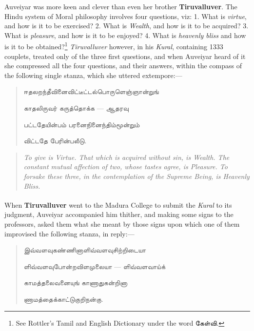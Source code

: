 \documentclass{article}
\newcommand{\TamilText}[1]{\texttamil{#1}}
\newcommand{\tam}[1]{\TamilText{#1}}
\begin{document}
Auveiyar was more keen and clever than even her brother \textbf{Tiruvalluver}. The Hindu system of Moral philosophy involves four questions, viz: 1. What is \emph{virtue}, and how is it to be exercised? 2. What is \emph{Wealth}, and how is it to be acquired? 3. What is \emph{pleasure}, and how is it to be enjoyed? 4. What is \emph{heavenly bliss} and how is it to be obtained?\footnote{See Rottler's Tamil and English Dictionary under the word \tam{கேள்வி}.} \emph{Tiruvalluver} however, in his \emph{Kural}, containing 1333 couplets, treated only of the three first questions, and when Auveiyar heard of it she compressed all the four questions, and their answers, within the compass of the following single stanza, which she uttered extempore:---
\begin{quotation}\small
\tam{ஈதலறந்தீவினைவிட்டீட்டல்பொருளெஞ்ஞான்றுங்‌}

\tam{காதலிருவர்‌ கருத்தொக்க} --- \tam{ஆதரவு}

\tam{பட்டதேயின்பம்‌ பரனைநினைந்திம்மூன்றும்‌}

\tam{விட்டதே பேரின்பலீடு}.
\end{quotation}
\begin{quotation}\small
\emph{To give is Virtue. That which is acquired without sin, is Wealth. The constant mutual affection of two, whose tastes agree, is Pleasure. To forsake these three, in the contemplation of the Supreme Being, is Heavenly Bliss.}
\end{quotation}
\paragraph{}
When \textbf{Tiruvalluver} went to the Madura College to submit the \emph{Kural} to its judgment, Auveiyar accompanied him thither, and making some signs to the professors, asked them what she meant by those signs upon which one of them improvised the following stanza, in reply:---
\begin{quotation}\small
\tam{இவ்வளவுகண்ணினாளிவ்‌வளவுசிற்றிடையா}

\tam{ளிவ்‌வளவுபோன்றவிளமுலையா} --- \tam{ளிவ்வளவாய்க்}

\tam{காமத்தலைவனையுங்‌ காணாதுகன்றினா}

\tam{ணாமத்தைக்காட்டுகுறிநன்கு}.
\end{quotation}
\end{document}
